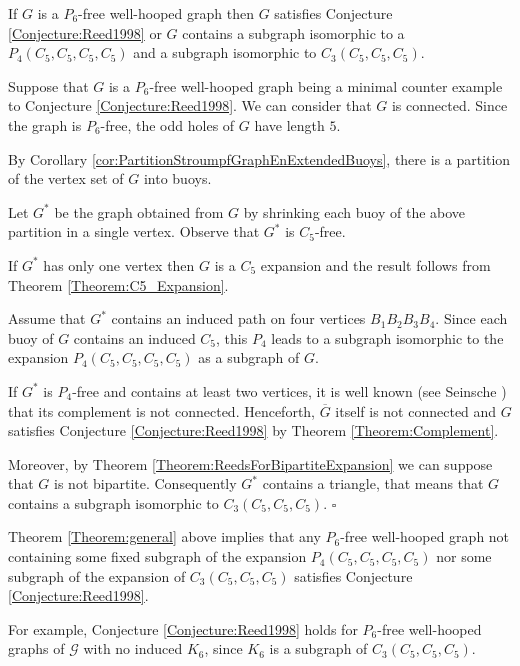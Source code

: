 \documentclass{amsart}
\theoremstyle{definition}
\theoremstyle{remark}
\newenvironment{prf}{{\bf \noindent Proof. } }{\hfill$\square$\\}
\newcommand{\wh}{well-hooped\xspace}
\newcommand{\extB}{buoy\xspace}
\newcommand{\extBs}{buoys\xspace}
\begin{document}
\begin{thm} \label{Theorem:general} If $G$ is a $P_6$-free \wh graph then $G$ satisfies Conjecture \ref{Conjecture:Reed1998} 
or $G$ contains a subgraph isomorphic to a $P_{4}(C_{5},C_{5},C_{5},C_{5})$ and a subgraph isomorphic to $C_3(C_5,C_5,C_5)$.
\end{thm}
\begin{prf}



Suppose that $G$ is  a $P_6$-free \wh graph being a minimal counter example to Conjecture \ref{Conjecture:Reed1998}.
We can consider that $G$ is connected. Since the graph is $P_6$-free, the odd holes of $G$ have length $5$. 

By Corollary \ref{cor:PartitionStroumpfGraphEnExtendedBuoys}, there is a partition of the vertex set of $G$ into \extBs. 

Let $G^{*}$ be the graph obtained from $G$ by shrinking each buoy of the above partition in a single vertex. Observe that $G^*$ is $C_5$-free.

If $G^{*}$ has only one vertex then $G$ is a $C_{5}$ expansion and the result follows from Theorem \ref{Theorem:C5_Expansion}.

Assume that $G^{*}$ contains an induced path on four vertices $B_{1}B_{2}B_{3}B_{4}$. Since each \extB of $G$ contains an induced $C_{5}$, this $P_{4}$ leads to a subgraph isomorphic to the expansion
$P_{4}(C_{5},C_{5},C_{5},C_{5})$ as a subgraph of $G$. 

If $G^{*}$ is $P_{4}$-free and contains at least two vertices, it is well known (see Seinsche \cite{Sei1974}) that its complement
is not connected.  Henceforth, $\overline{G}$ itself is not connected and $G$ satisfies Conjecture \ref{Conjecture:Reed1998} by Theorem \ref{Theorem:Complement}.

Moreover, by Theorem \ref{Theorem:ReedsForBipartiteExpansion} we can suppose that $G$ is not bipartite. Consequently $G^*$ contains a triangle, that means that $G$ contains a subgraph isomorphic to $C_3(C_5,C_5,C_5)$.
\end{prf}



Theorem \ref{Theorem:general} above implies that any $P_6$-free \wh graph   not containing some fixed subgraph of the expansion 
$P_{4}(C_{5},C_5,C_5,C_5)$ nor some subgraph of the expansion of $C_3(C_5, C_5, C_5)$ satisfies Conjecture \ref{Conjecture:Reed1998}.

For example, Conjecture \ref{Conjecture:Reed1998} holds for $P_6$-free \wh graphs of $\mathcal{G}$ with no induced $K_6$, since $K_6$ is a subgraph of $C_3(C_5,C_5,C_5)$.
\end{document}
